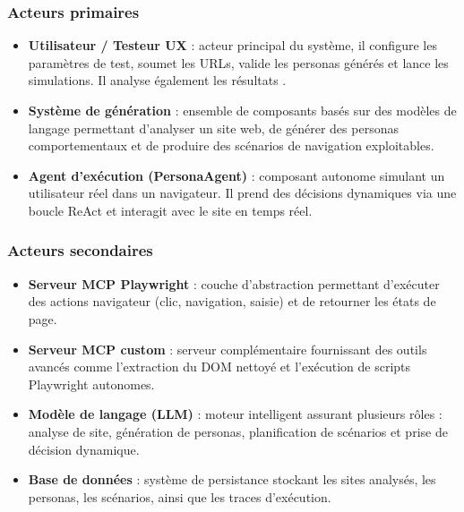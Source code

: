 \subsubsection{Acteurs primaires}

\begin{itemize}

\item \textbf{Utilisateur / Testeur UX} : acteur principal du système, il configure les paramètres de test, soumet les URLs, valide les personas générés et lance les simulations. Il analyse également les résultats .\\

\item \textbf{Système de génération} : ensemble de composants basés sur des modèles de langage permettant d’analyser un site web, de générer des personas comportementaux et de produire des scénarios de navigation exploitables.\\

\item \textbf{Agent d’exécution (PersonaAgent)} : composant autonome simulant un utilisateur réel dans un navigateur. Il prend des décisions dynamiques via une boucle ReAct et interagit avec le site en temps réel.\\

\end{itemize}

\subsubsection{Acteurs secondaires}

\begin{itemize}

\item \textbf{Serveur MCP Playwright} : couche d’abstraction permettant d’exécuter des actions navigateur (clic, navigation, saisie) et de retourner les états de page.\\

\item \textbf{Serveur MCP custom} : serveur complémentaire fournissant des outils avancés comme l’extraction du DOM nettoyé et l’exécution de scripts Playwright autonomes.\\

\item \textbf{Modèle de langage (LLM)} : moteur intelligent assurant plusieurs rôles : analyse de site, génération de personas, planification de scénarios et prise de décision dynamique.\\

\item \textbf{Base de données} : système de persistance stockant les sites analysés, les personas, les scénarios, ainsi que les traces d’exécution.\\

\end{itemize}

